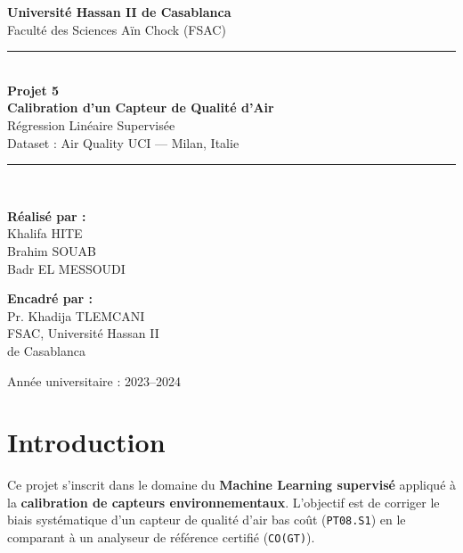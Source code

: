 \documentclass[12pt, a4paper]{article}
\begin{document}
\begin{titlepage}
    \centering
    \vspace*{2cm}

    {\Large \textbf{Université Hassan II de Casablanca}}\\[0.3cm]
    {\large Faculté des Sciences Aïn Chock (FSAC)}\\[0.3cm]
    \rule{\linewidth}{0.5mm}\\[1cm]

    {\Huge \textbf{Projet 5}}\\[0.5cm]
    {\LARGE \textbf{Calibration d'un Capteur de Qualité d'Air}}\\[0.3cm]
    {\Large Régression Linéaire Supervisée}\\[0.3cm]
    {\large Dataset : Air Quality UCI — Milan, Italie}\\[1cm]

    \rule{\linewidth}{0.5mm}\\[1cm]

    \begin{minipage}{0.45\textwidth}
        \centering
        \textbf{Réalisé par :}\\[0.3cm]
        Khalifa HITE\\
        Brahim SOUAB\\
        Badr EL MESSOUDI
    \end{minipage}
    \hfill
    \begin{minipage}{0.45\textwidth}
        \centering
        \textbf{Encadré par :}\\[0.3cm]
        Pr. Khadija TLEMCANI\\
        FSAC, Université Hassan II\\
        de Casablanca
    \end{minipage}

    \vfill
    {\large Année universitaire : 2023--2024}
\end{titlepage}

\tableofcontents
\newpage

\section{Introduction}

Ce projet s'inscrit dans le domaine du \textbf{Machine Learning supervisé} appliqué à la 
\textbf{calibration de capteurs environnementaux}. L'objectif est de corriger le biais 
systématique d'un capteur de qualité d'air bas coût (\texttt{PT08.S1}) en le comparant 
à un analyseur de référence certifié (\texttt{CO(GT)}).
\end{document}
